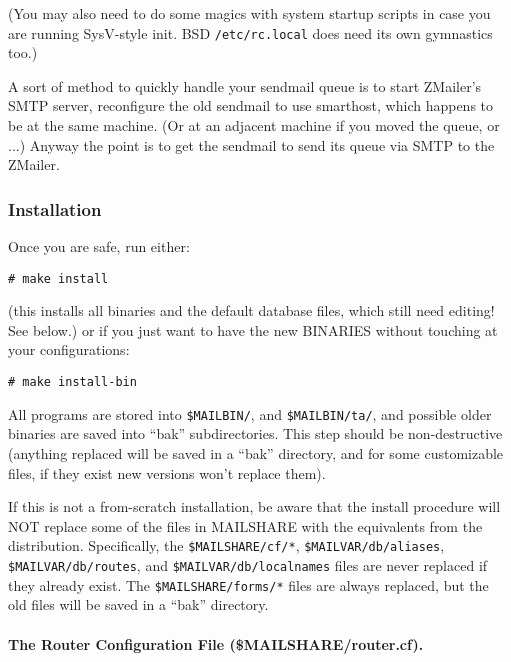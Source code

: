 (You may also need to do some magics with system startup scripts
in case you are running SysV-style init. BSD {\tt /etc/rc.local}
does need its own gymnastics too.)

A sort of method to quickly handle your sendmail queue is to
start ZMailer's SMTP server, reconfigure the old sendmail to
use smarthost, which happens to be at the same machine.
(Or at an adjacent machine if you moved the queue, or ...)
Anyway the point is to get the sendmail to send its queue
via SMTP to the ZMailer.




\subsubsection{Installation}

Once you are safe, run either:
\begin{tscreen}
\begin{verbatim}
# make install
\end{verbatim}
\end{tscreen}

(this installs all binaries and the default database files, which
still need editing! See below.)
or if you just want to have the new BINARIES without touching
at your configurations:
\begin{tscreen}
\begin{verbatim}
# make install-bin
\end{verbatim}
\end{tscreen}

All programs are stored into  {\tt \$MAILBIN/}, and {\tt \$MAILBIN/ta/}, and
possible older binaries are saved into ``bak'' subdirectories.
This step should be non-destructive (anything replaced will be
saved in a ``bak'' directory, and for some customizable files, if
they exist new versions won't replace them).

If this is not a from-scratch installation, be aware that the
install procedure will NOT replace some of the files in MAILSHARE
with the equivalents from the distribution.  Specifically, the
{\tt \$MAILSHARE/cf/*}, {\tt \$MAILVAR/db/aliases}, {\tt \$MAILVAR/db/routes}, and
{\tt \$MAILVAR/db/localnames} files are never replaced if they already
exist.  The {\tt \$MAILSHARE/forms/*} files are always replaced, but the
old files will be saved in a ``bak'' directory.




\paragraph{The Router Configuration File (\$MAILSHARE/router.cf).}



